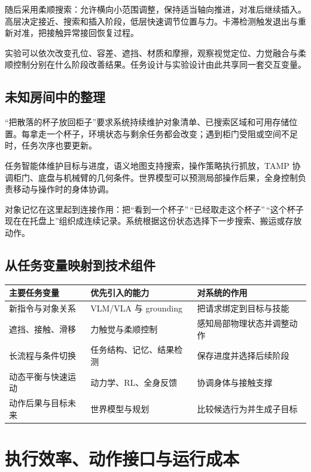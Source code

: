 \documentclass[UTF8,a4paper,11pt,oneside,openany,fontset=none]{ctexbook}
\begin{document}
随后采用柔顺搜索：允许横向小范围调整，保持适当轴向推进，对准后继续插入。高层决定接近、搜索和插入阶段，低层快速调节位置与力。卡滞检测触发退出与重新对准，把接触异常接回恢复过程。

实验可以依次改变孔位、容差、遮挡、材质和摩擦，观察视觉定位、力觉融合与柔顺控制分别在什么阶段改善结果。任务设计与实验设计由此共享同一套交互变量。

\section{未知房间中的整理}

``把散落的杯子放回柜子''要求系统持续维护对象清单、已搜索区域和可用存储位置。每拿走一个杯子，环境状态与剩余任务都会改变；遇到柜门受阻或空间不足时，任务次序也要更新。

任务智能体维护目标与进度，语义地图支持搜索，操作策略执行抓放，TAMP 协调柜门、底盘与机械臂的几何条件。世界模型可以预测局部操作后果，全身控制负责移动与操作时的身体协调。

对象记忆在这里起到连接作用：把``看到一个杯子''\,``已经取走这个杯子''\,``这个杯子现在在托盘上''组织成连续记录。系统根据这份状态选择下一步搜索、搬运或存放动作。

\section{从任务变量映射到技术组件}

{\small %
\begin{longtable}[]{@{}lll@{}}
\toprule\noalign{}
主要任务变量 & 优先引入的能力 & 对系统的作用 \\
\midrule\noalign{}
\endhead
\bottomrule\noalign{}
\endlastfoot
新指令与对象关系 & VLM/VLA 与 grounding & 把请求绑定到目标与技能 \\
遮挡、接触、滑移 & 力触觉与柔顺控制 & 感知局部物理状态并调整动作 \\
长流程与条件切换 & 任务结构、记忆、结果检测 & 保存进度并选择后续阶段 \\
动态平衡与快速运动 & 动力学、RL、全身反馈 & 协调身体与接触支撑 \\
动作后果与目标未来 & 世界模型与规划 & 比较候选行为并生成子目标 \\
\end{longtable}
}

\chapter{执行效率、动作接口与运行成本}
\end{document}
